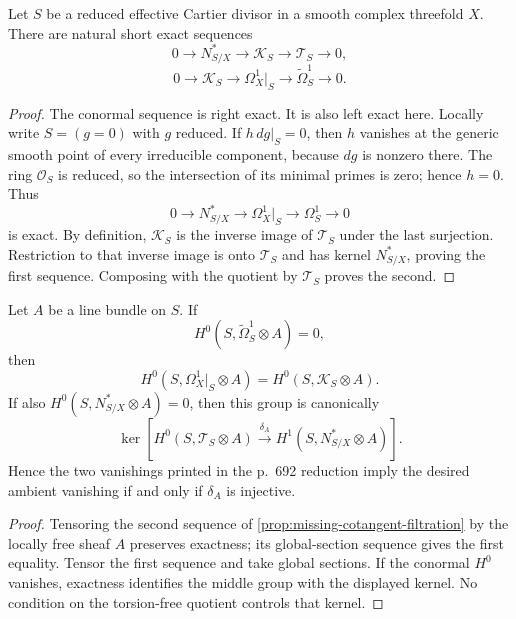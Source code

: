 \begin{proposition}
\label{prop:missing-cotangent-filtration}
Let $S$ be a reduced effective Cartier divisor in a smooth complex
threefold $X$.  There are natural short exact sequences
\[
0\longrightarrow N^*_{S/X}\longrightarrow\mathscr K_S
\longrightarrow\mathscr T_S\longrightarrow0,
\]
\[
0\longrightarrow\mathscr K_S\longrightarrow\Omega_X^1|_S
\longrightarrow\widetilde\Omega_S^1\longrightarrow0.
\]
\end{proposition}

\begin{proof}
The conormal sequence is right exact.  It is also left exact here.  Locally
write $S=(g=0)$ with $g$ reduced.  If $h\,dg|_S=0$, then $h$ vanishes at the
generic smooth point of every irreducible component, because $dg$ is nonzero
there.  The ring $\mathcal O_S$ is reduced, so the intersection of its
minimal primes is zero; hence $h=0$.  Thus
\[
0\to N^*_{S/X}\to\Omega_X^1|_S\to\Omega_S^1\to0
\]
is exact.  By definition, $\mathscr K_S$ is the inverse image of
$\mathscr T_S$ under the last surjection.  Restriction to that inverse image
is onto $\mathscr T_S$ and has kernel $N^*_{S/X}$, proving the first
sequence.  Composing with the quotient by $\mathscr T_S$ proves the second.
\end{proof}

\begin{proposition}
\label{prop:missing-global-section-criterion}
Let $A$ be a line bundle on $S$.  If
\[
H^0(S,\widetilde\Omega_S^1\otimes A)=0,
\]
then
\[
H^0(S,\Omega_X^1|_S\otimes A)
=H^0(S,\mathscr K_S\otimes A).
\]
If also $H^0(S,N^*_{S/X}\otimes A)=0$, then this group is canonically
\[
\ker\!\left[
H^0(S,\mathscr T_S\otimes A)
\xrightarrow{\delta_A}H^1(S,N^*_{S/X}\otimes A)
\right].
\]
Hence the two vanishings printed in the p.~692 reduction imply the desired
ambient vanishing if and only if $\delta_A$ is injective.
\end{proposition}

\begin{proof}
Tensoring the second sequence of
\cref{prop:missing-cotangent-filtration} by the locally free sheaf $A$
preserves exactness; its global-section sequence gives the first equality.
Tensor the first sequence and take global sections.  If the conormal
$H^0$ vanishes, exactness identifies the middle group with the displayed
kernel.  No condition on the torsion-free quotient controls that kernel.
\end{proof}

